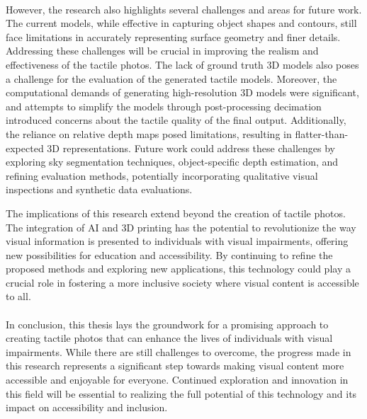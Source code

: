 \documentclass[12pt, letterpaper]{article}
\begin{document}
\begin{spacing}{1.15}
\paragraph{}
However, the research also highlights several challenges and areas for future work. The current models, while effective in capturing object shapes and contours,
still face limitations in accurately representing surface geometry and finer details. Addressing these challenges will be crucial in improving the realism and
effectiveness of the tactile photos. The lack of ground truth 3D models also poses a challenge for the evaluation of the generated tactile models.
Moreover, the computational demands of generating high-resolution 3D models were significant, and attempts to simplify the models through post-processing
decimation introduced concerns about the tactile quality of the final output. Additionally, the reliance on relative depth
maps posed limitations, resulting in flatter-than-expected 3D representations. Future work could address these challenges by exploring sky segmentation 
techniques, object-specific depth estimation, and refining evaluation methods, potentially incorporating qualitative visual inspections and synthetic data
evaluations.

The implications of this research extend beyond the creation of tactile photos. The integration of AI and 3D printing has the potential to revolutionize the way
visual information is presented to individuals with visual impairments, offering new possibilities for education and accessibility. By continuing to refine
the proposed methods and exploring new applications, this technology could play a crucial role in fostering a more inclusive society where
visual content is accessible to all.
\paragraph{}
In conclusion, this thesis lays the groundwork for a promising approach to creating tactile photos that can enhance the lives of individuals with visual
impairments. While there are still challenges to overcome, the progress made in this research represents a significant step towards making visual content more
accessible and enjoyable for everyone. Continued exploration and innovation in this field will be essential to realizing the full potential of this technology
and its impact on accessibility and inclusion.

\end{spacing}
\newpage
\end{document}
